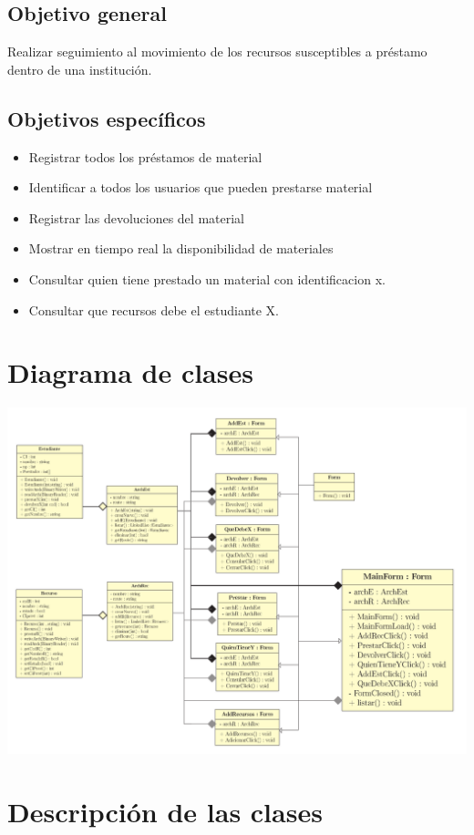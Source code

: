\documentclass[12pt]{article}
\begin{document}
\subsection{Objetivo general}
Realizar seguimiento al movimiento de los recursos susceptibles a préstamo dentro de una institución.  
\subsection{Objetivos específicos}
\begin{itemize}
\item Registrar todos los préstamos de material
\item Identificar a todos los usuarios que pueden prestarse material
\item Registrar las devoluciones del material
\item Mostrar en tiempo real la disponibilidad de materiales
\item Consultar quien tiene prestado un material con identificacion x.
\item Consultar que recursos debe el estudiante X.  

\end{itemize}
\newpage
\section{Diagrama de clases}
\includegraphics[scale=0.89, angle = -90]{UML/Diagrama.pdf}

\newpage
\section{Descripción de las clases}
\end{document}
